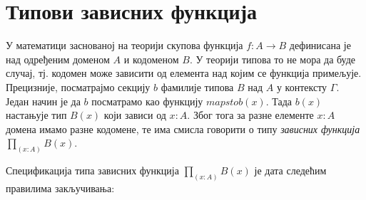 \documentclass[12pt,oneside]{memoir}
\begin{document}
\newpage%
\section{Типови зависних функција}

У математици заснованој на теорији скупова функција $f : A \to B$ дефинисана је над одређеним доменом $A$ и кодоменом $B$. У теорији типова то не мора да буде случај, тј. кодомен може зависити од елемента над којим се функција примељује. Прецизније, посматрајмо секцију $b$ фамилије типова $B$ над $A$ у контексту $\Gamma$. Један начин је да $b$ посматрамо као функцију $mapsto b(x)$. Тада $b(x)$ настањује тип $B(x)$ који зависи од $x : A$. Због тога за разне елементе $x : A$ домена имамо разне кодомене, те има смисла говорити о типу \emph{зависних функција} $\prod_{(x : A)} B(x)$. 

Спецификација типа зависних функција $\prod_{(x:A)} B(x)$ је дата следећим правилима закључивања:
\end{document}
